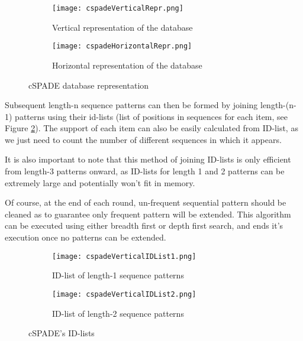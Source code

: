 \documentclass{eplmastersthesis}
\begin{document}
\begin{figure}[h]
  \centering
  \begin{subfigure}[t]{0.4\textwidth}
  	\centering
  	\texttt{[image: cspadeVerticalRepr.png]}
    \caption{Vertical representation of the database}
  \end{subfigure}
  \begin{subfigure}[t]{0.59\textwidth}
  	\centering
    \texttt{[image: cspadeHorizontalRepr.png]}
    \caption{Horizontal representation of the database}
  \end{subfigure}
  \caption{cSPADE database representation}
  \label{ex:cspadeDatabaseRepr}
\end{figure}

Subsequent length-n sequence patterns can then be formed by joining length-(n-1) patterns using their id-lists (list of positions in sequences for each item, see Figure \ref{fig:cspadeIDList}). The support of each item can also be easily calculated from ID-list, as we just need to count the number of different sequences in which it appears.  \newline

It is also important to note that this method of joining ID-lists is only efficient from length-3 patterns onward, as ID-lists for length 1 and 2 patterns can be extremely large and potentially won't fit in memory. \newline

Of course, at the end of each round, un-frequent sequential pattern should be cleaned as to guarantee only frequent pattern will be extended. This algorithm can be executed using either breadth first or depth first search, and ends it's execution once no patterns can be extended.

\begin{figure}[h]
  \centering
  \begin{subfigure}[t]{0.54\textwidth}
  	\centering
  	\texttt{[image: cspadeVerticalIDList1.png]}
    \caption{ID-list of length-1 sequence patterns}
  \end{subfigure}
  \begin{subfigure}[t]{0.45\textwidth}
  	\centering
    \texttt{[image: cspadeVerticalIDList2.png]}
    \caption{ID-list of length-2 sequence patterns}
  \end{subfigure}
  \caption{cSPADE's ID-lists}
  \label{fig:cspadeIDList}
\end{figure}
\end{document}
